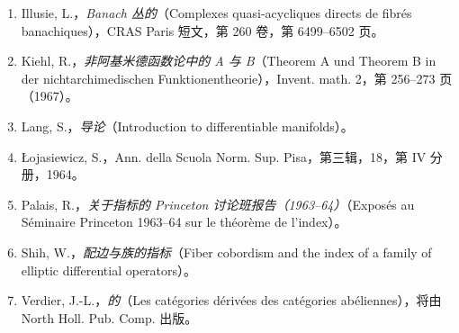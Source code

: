 \begin{enumerate}
\item[{[12]}] Illusie, L.，\emph{Banach 丛的}（Complexes quasi-acycliques directs de fibrés banachiques），CRAS Paris 短文，第 260 卷，第 6499--6502 页。
\item[{[13]}] Kiehl, R.，\emph{非阿基米德函数论中的 A 与 B}（Theorem A und Theorem B in der nichtarchimedischen Funktionentheorie），Invent. math. 2，第 256--273 页（1967）。
\item[{[14]}] Lang, S.，\emph{导论}（Introduction to differentiable manifolds）。
\item[{[15]}] Łojasiewicz, S.，Ann. della Scuola Norm. Sup. Pisa，第三辑，18，第 IV 分册，1964。
\item[{[16]}] Palais, R.，\emph{关于指标的 Princeton 讨论班报告（1963--64）}（Exposés au Séminaire Princeton 1963--64 sur le théorème de l'index）。
\item[{[17]}] Shih, W.，\emph{配边与族的指标}（Fiber cobordism and the index of a family of elliptic differential operators）。
\item[{[18]}] Verdier, J.-L.，\emph{的}（Les catégories dérivées des catégories abéliennes），将由 North Holl. Pub. Comp. 出版。
\end{enumerate}
